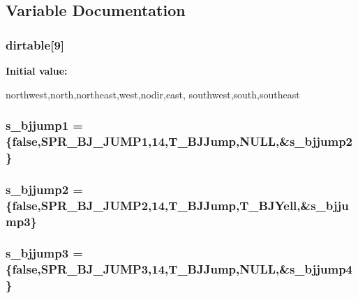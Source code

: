 \subsection{Variable Documentation}
\hypertarget{WL__ACT2_8C_a4dfa6f1f625ea98fc62700c2de6c7498}{
\subsubsection[{dirtable}]{ {\bf dirtable}\mbox{[}9\mbox{]}}}
\label{WL__ACT2_8C_a4dfa6f1f625ea98fc62700c2de6c7498}
{\bfseries Initial value:}
\begin{DoxyCode}
 {northwest,north,northeast,west,nodir,east,
        southwest,south,southeast}
\end{DoxyCode}
\hypertarget{WL__ACT2_8C_ad95a6e38473888f6b3b141ff54ed0056}{
\subsubsection[{s\_\-bjjump1}]{ {\bf s\_\-bjjump1} = \{false,SPR\_\-BJ\_\-JUMP1,14,T\_\-BJJump,NULL,\&{\bf s\_\-bjjump2}\}}}
\label{WL__ACT2_8C_ad95a6e38473888f6b3b141ff54ed0056}
\hypertarget{WL__ACT2_8C_aae89f6563edc5452bb5311e309fc2094}{
\subsubsection[{s\_\-bjjump2}]{ {\bf s\_\-bjjump2} = \{false,SPR\_\-BJ\_\-JUMP2,14,T\_\-BJJump,T\_\-BJYell,\&{\bf s\_\-bjjump3}\}}}
\label{WL__ACT2_8C_aae89f6563edc5452bb5311e309fc2094}
\hypertarget{WL__ACT2_8C_a59fc5f0c6e33a8d6d1dfafd3c775c20f}{
\subsubsection[{s\_\-bjjump3}]{ {\bf s\_\-bjjump3} = \{false,SPR\_\-BJ\_\-JUMP3,14,T\_\-BJJump,NULL,\&{\bf s\_\-bjjump4}\}}}
\label{WL__ACT2_8C_a59fc5f0c6e33a8d6d1dfafd3c775c20f}
